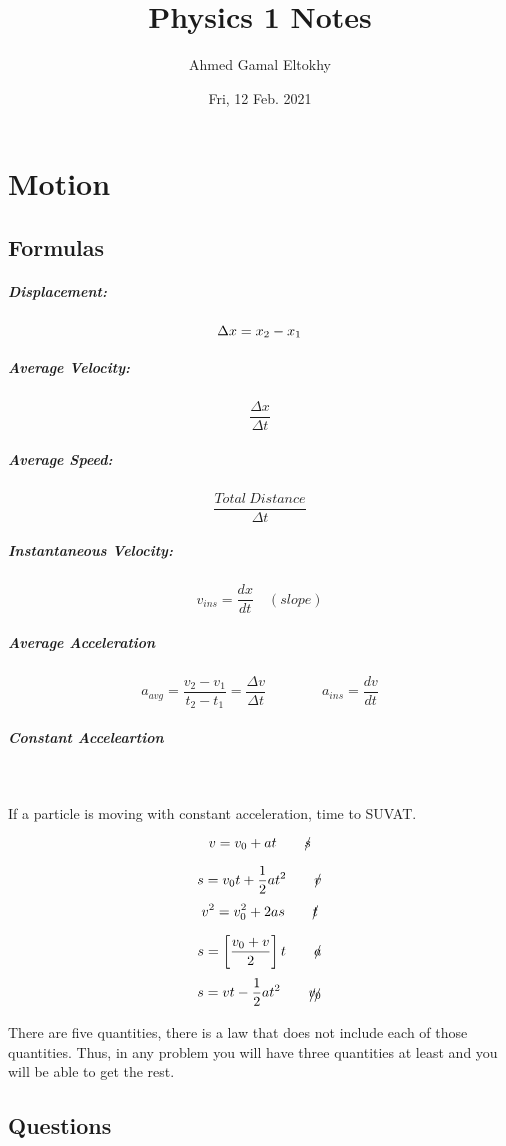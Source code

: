 \documentclass{article}
\title{Physics 1 Notes}
\date{Fri, 12 Feb. 2021}
\author{Ahmed Gamal Eltokhy}
\begin{document}
\maketitle
{}
\newpage

\tableofcontents
\newpage


\section{Motion}

\subsection{Formulas} 

\subparagraph{Displacement:} \[  \Delta x = x_2 - x_1 \\ \]
\subparagraph{Average Velocity:} \[
	\frac{ \Delta x }{ \Delta t}
\]
\subparagraph{Average Speed:}
\[
	\frac{Total \ Distance }{ \Delta t	}
\]
\subparagraph{Instantaneous Velocity:}
\[
	v_{ins} = \frac{ dx }{ dt } \quad	(slope)
\]
\subparagraph{Average Acceleration}
\[
	a_{avg} = \frac{ v_2-v_1 }{t_2-t_1  } = \frac{ \Delta v }{ \Delta t} \qquad \qquad
	a_{ins} = \frac{ dv }{ dt }	
\]

\subparagraph{Constant Acceleartion} \

If a particle is moving with constant acceleration, time to SUVAT.

\[	v = v_0 + a t \qquad \xout{s} \]
\[	s = v_0 t + \frac{ 1 }{ 2 } a t^2 \qquad  \xout{v} \]
\[ v^2 = v_0^2 + 2 a s \qquad  \xout{t} \]
\[	s = \left[ \frac{ v_0 + v }{2}  \right] t \qquad  \xout{a} \]
\[	s = v t - \frac{ 1 }{ 2 } a t^2  \qquad \xout{v_0} \]

There are five quantities, there is a law that does not include each of those quantities. Thus, in any problem you will have three quantities at least and you will be able to get the rest.

\newpage

\subsection{Questions}
\end{document}
